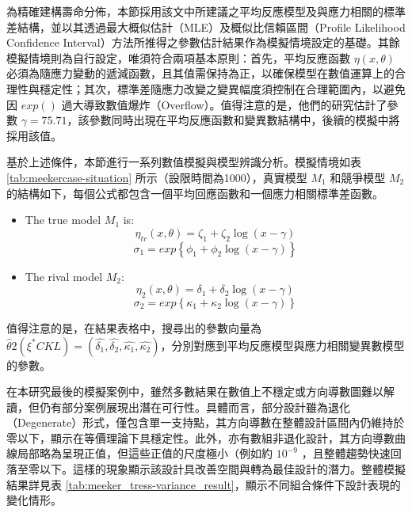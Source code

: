 \hspace*{8mm} 為精確建構壽命分佈，本節採用該文中所建議之平均反應模型及與應力相關的標準差結構，並以其透過最大概似估計（MLE）及概似比信賴區間（Profile Likelihood Confidence Interval）方法所推得之參數估計結果作為模擬情境設定的基礎。其餘模擬情境則為自行設定，唯須符合兩項基本原則：首先，平均反應函數 $\eta(x,\theta)$ 必須為隨應力變動的遞減函數，且其值需保持為正，以確保模型在數值運算上的合理性與穩定性；其次，標準差隨應力改變之變異幅度須控制在合理範圍內，以避免因 $exp()$ 過大導致數值爆炸（Overflow）。值得注意的是，他們的研究估計了參數 $\gamma=75.71$，該參數同時出現在平均反應函數和變異數結構中，後續的模擬中將採用該值。

\hspace*{8mm} 基於上述條件，本節進行一系列數值模擬與模型辨識分析。模擬情境如表 \ref{tab:meekercase-situation} 所示（設限時間為1000），真實模型 $M_1$ 和競爭模型 $M_2$ 的結構如下，每個公式都包含一個平均回應函數和一個應力相關標準差函數。

\begin{itemize}
\item The true model $M_1$ is:
\begin{equation}\label{meeker_truemodel}
\eta_{tr}(x,\theta)=\zeta_1+\zeta_2\log(x-\gamma)
\end{equation}
\begin{equation}\label{meeker_truemodel_variance}
\sigma_1=exp\left\{\phi_1+\phi_2\log(x-\gamma)\right\}
\end{equation}

\item The rival model $M_2$: 
\begin{equation}\label{meeker_rivalmodel}
\eta_2(x,\theta)=\delta_1+\delta_2\log(x-\gamma)
\end{equation}
\begin{equation}\label{meeker_truemodel_variance}
\sigma_2=exp\left\{\kappa_1+\kappa_2\log(x-\gamma)\right\}
\end{equation}

\end{itemize}

\hspace*{8mm} 值得注意的是，在結果表格中，搜尋出的參數向量為 $\hat{\theta}2(\xi^*{CKL})=(\hat{\delta_1},\hat{\delta_2},\hat{\kappa_1},\hat{\kappa_2})$，分別對應到平均反應模型與應力相關變異數模型的參數。

\hspace*{8mm} 在本研究最後的模擬案例中，雖然多數結果在數值上不穩定或方向導數圖難以解讀，但仍有部分案例展現出潛在可行性。具體而言，部分設計雖為退化（Degenerate）形式，僅包含單一支持點，其方向導數在整體設計區間內仍維持於零以下，顯示在等價理論下具穩定性。此外，亦有數組非退化設計，其方向導數曲線局部略為呈現正值，但這些正值的尺度極小（例如約 $10^{-9}$ ，且整體趨勢快速回落至零以下。這樣的現象顯示該設計具改善空間與轉為最佳設計的潛力。整體模擬結果詳見表 \ref{tab:meeker_tress-variance_result}，顯示不同組合條件下設計表現的變化情形。

